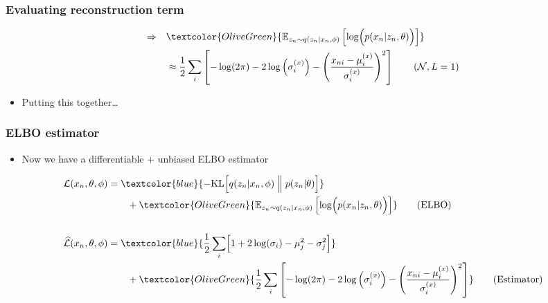 \documentclass[xcolor=table,dvipsnames]{beamer}
\begin{document}
\begin{frame}
    \frametitle{Evaluating reconstruction term}
    \begin{align*}
        \Rightarrow\quad & \textcolor{OliveGreen}{\mathbb{E}_{z_n\sim q(z_n \vert x_n, \phi)}\left[ \log \Bigl(p(x_n \vert z_n, \theta)\Bigr) \right]} \\
        &\approx \frac{1}{2}\sum_i\left[ -\log(2\pi) - 2\log\left( \sigma^{(x)}_i \right) - \left(\frac{x_{ni}-\mu^{(x)}_i}{\sigma^{(x)}_i}\right)^2 \right] \tag{$\mathcal{N},L=1$}
    \end{align*}
    \begin{itemize}
        \item Putting this together\dots
    \end{itemize}
\end{frame}

\begin{frame}
    \frametitle{ELBO estimator}
    \begin{itemize}
        \item Now we have a differentiable + unbiased ELBO estimator \Smiley
    \end{itemize}
    \begin{align*}
        \mathcal{L}(x_n, \theta, \phi) &= \textcolor{blue}{{-\text{KL}\Bigl[q(z_n \vert x_n, \phi) \Bigm\Vert p(z_n \vert \theta)\Bigr]}} \\
        &\qquad + \textcolor{OliveGreen}{\mathbb{E}_{z_n\sim q(z_n \vert x_n, \phi)}\left[ \log \Bigl(p(x_n \vert z_n, \theta)\Bigr) \right]} \tag{ELBO} \\
        \\
        \widehat{\mathcal{L}}(x_n, \theta, \phi) &= \textcolor{blue}{\frac{1}{2}\sum_i \Bigl[ 1 + 2\log(\sigma_i) - \mu_j^2 - \sigma_j^2 \Bigr]} \\
        &\qquad + \textcolor{OliveGreen}{\frac{1}{2}\sum_i\left[ -\log(2\pi) - 2\log\left( \sigma^{(x)}_i \right) - \left(\frac{x_{ni}-\mu^{(x)}_i}{\sigma^{(x)}_i}\right)^2 \right]} \tag{Estimator}
    \end{align*}
\end{frame}
\end{document}
